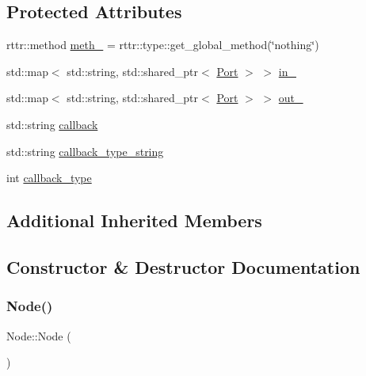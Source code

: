 \subsection*{Protected Attributes}
\begin{DoxyCompactItemize}
\item 
rttr\+::method \hyperlink{class_node_a34e4ef7089672adaa8aa31277aa5f159}{meth\+\_\+} = rttr\+::type\+::get\+\_\+global\+\_\+method(\char`\"{}nothing\char`\"{})
\item 
std\+::map$<$ std\+::string, std\+::shared\+\_\+ptr$<$ \hyperlink{class_port}{Port} $>$ $>$ \hyperlink{class_node_a2970ced9f376dd6c5d512d0bbb7cbb54}{in\+\_\+}
\item 
std\+::map$<$ std\+::string, std\+::shared\+\_\+ptr$<$ \hyperlink{class_port}{Port} $>$ $>$ \hyperlink{class_node_a324497db3924989e08e8ee0411d5972e}{out\+\_\+}
\item 
std\+::string \hyperlink{class_node_a3755609fd44cf5b86c8a7d1f94d9747b}{callback}
\item 
std\+::string \hyperlink{class_node_aa6465260fcaaecbb7bc8847dbbeb3ba6}{callback\+\_\+type\+\_\+string}
\item 
int \hyperlink{class_node_a290c95a63ae639d150355764ea1f4b54}{callback\+\_\+type}
\end{DoxyCompactItemize}
\subsection*{Additional Inherited Members}


\subsection{Constructor \& Destructor Documentation}
\mbox{\label{class_node_ad7a34779cad45d997bfd6d3d8043c75f}} 
\subsubsection{\texorpdfstring{Node()}{Node()}\hspace{0.1cm}{\footnotesize\ttfamily [1/3]}}
{\footnotesize\ttfamily Node\+::\+Node (\begin{DoxyParamCaption}{ }\end{DoxyParamCaption})}

\mbox{\label{class_node_afceb8877cfab44e0eda5ae3a88513242}} 
